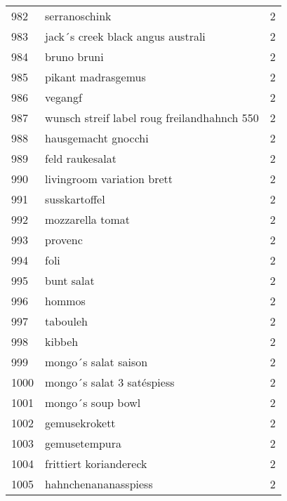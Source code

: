 \begin{tabular}{llr}
982  &                                      serranoschink &      2 \\
983  &                  jack´s creek black angus australi &      2 \\
984  &                                        bruno bruni &      2 \\
985  &                                 pikant madrasgemus &      2 \\
986  &                                            vegangf &      2 \\
987  &        wunsch streif label roug freilandhahnch 550 &      2 \\
988  &                                hausgemacht gnocchi &      2 \\
989  &                                    feld raukesalat &      2 \\
990  &                         livingroom variation brett &      2 \\
991  &                                      susskartoffel &      2 \\
992  &                                   mozzarella tomat &      2 \\
993  &                                            provenc &      2 \\
994  &                                               foli &      2 \\
995  &                                         bunt salat &      2 \\
996  &                                             hommos &      2 \\
997  &                                           tabouleh &      2 \\
998  &                                             kibbeh &      2 \\
999  &                               mongo´s salat saison &      2 \\
1000 &                         mongo´s salat 3 satéspiess &      2 \\
1001 &                                  mongo´s soup bowl &      2 \\
1002 &                                      gemusekrokett &      2 \\
1003 &                                      gemusetempura &      2 \\
1004 &                             frittiert koriandereck &      2 \\
1005 &                               hahnchenananasspiess &      2 \\

\end{tabular}
